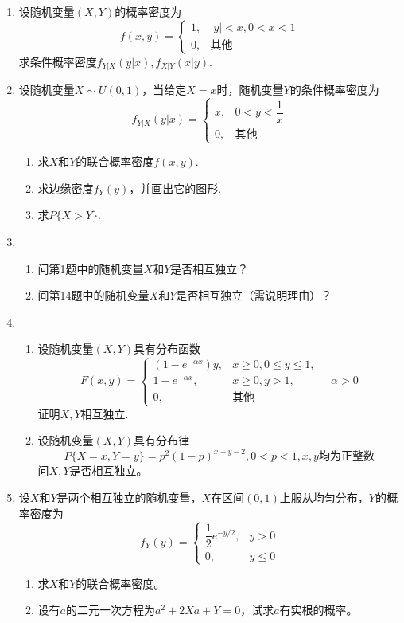 \documentclass[10pt,a4paper]{article}
\begin{document}
\begin{enumerate}
     \item 设随机变量$(X,Y)$的概率密度为
     $$f(x,y)=\left\{\begin{array}{ll}
         1, & |y|<x,0<x<1\\
         0, & \mbox{其他}
     \end{array}\right.$$
     求条件概率密度$f_{Y|X}(y|x),f_{X|Y}(x|y)$.


     \item 设随机变量$X\sim U(0,1)$，当给定$X=x$时，随机变量$Y$的条件概率密度为
     $$f_{Y|X}(y|x)=\left\{\begin{array}{ll}
         x, & 0<y<\dfrac{1}{x} \\
         0, & \mbox{其他}
     \end{array}\right.$$
     \begin{enumerate}
         \item 求$X$和$Y$的联合概率密度$f(x,y)$.
         \item 求边缘密度$f_Y(y)$，并画出它的图形.
         \item 求$P\{X>Y\}$.
     \end{enumerate}


     \item \begin{enumerate}
         \item 问第1题中的随机变量$X$和$Y$是否相互独立？
         \item 间第14题中的随机变量$X$和$Y$是否相互独立（需说明理由）？
     \end{enumerate}


     \item \begin{enumerate}
         \item 设随机变量$(X,Y)$具有分布函数
         $$F(x,y)=\left\{\begin{array}{ll}
             (1-e^{-\alpha x})y, & x\geq 0,0\leq y \leq 1,\\
             1-e^{-\alpha x}, & x\geq 0,y>1,\\
             0, & \mbox{其他}
         \end{array}\right.\quad \alpha>0$$
         证明$X,Y$相互独立.
         \item 设随机变量$(X,Y)$具有分布律
         $$P\{X=x,Y=y\}=p^2(1-p)^{x+y-2},0<p<1,x,y\mbox{均为正整数}$$
         问$X,Y$是否相互独立。
     \end{enumerate}



     \item 设$X$和$Y$是两个相互独立的随机变量，$X$在区间$(0,1)$上服从均匀分布，$Y$的概率密度为
     $$f_Y(y)=\left\{\begin{array}{ll}
         \dfrac{1}{2} e^{-y/2}, & y>0\\
         0, & y\leq 0
     \end{array}\right.$$
     \begin{enumerate}
         \item 求$X$和$Y$的联合概率密度。
         \item 设有$a$的二元一次方程为$a^2+2Xa+Y=0$，试求$a$有实根的概率。
     \end{enumerate}




\end{enumerate}
\end{document}
